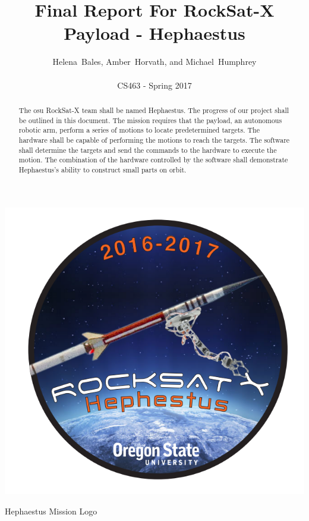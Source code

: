 \documentclass[letterpaper,10pt]{article}
\title{Final Report For RockSat-X Payload - Hephaestus}
\author{Helena~Bales, Amber~Horvath, and Michael~Humphrey\\ \\ CS463 - Spring 2017}
\begin{document}
\maketitle

\begin{abstract}
The \gls{osu} RockSat-X team shall be named Hephaestus.
The progress of our project shall be outlined in this document.
The mission requires that the \gls{payload}, an autonomous robotic arm, perform a series of motions to locate predetermined targets.
The hardware shall be capable of performing the motions to reach the targets.
The software shall determine the targets and send the commands to the hardware to execute the motion.
The combination of the hardware controlled by the software shall demonstrate Hephaestus's ability to construct small parts on orbit.
\end{abstract}

\begin{center}
\includegraphics[scale=.03]{logo}

Hephaestus Mission Logo
\end{center}
\end{document}

